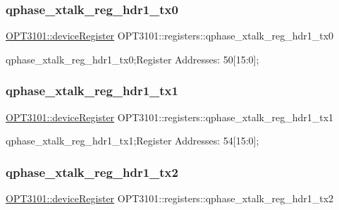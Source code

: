 \subsubsection{\texorpdfstring{qphase\+\_\+xtalk\+\_\+reg\+\_\+hdr1\+\_\+tx0}{qphase\_xtalk\_reg\_hdr1\_tx0}}
{\footnotesize\ttfamily \mbox{\hyperlink{class_o_p_t3101_1_1device_register}{O\+P\+T3101\+::device\+Register}} O\+P\+T3101\+::registers\+::qphase\+\_\+xtalk\+\_\+reg\+\_\+hdr1\+\_\+tx0}



qphase\+\_\+xtalk\+\_\+reg\+\_\+hdr1\+\_\+tx0;Register Addresses\+: 50\mbox{[}15\+:0\mbox{]}; 

\mbox{\label{class_o_p_t3101_1_1registers_a0d5f4bb0aaa58ed3a96bb2740eb6287e}} 
\subsubsection{\texorpdfstring{qphase\+\_\+xtalk\+\_\+reg\+\_\+hdr1\+\_\+tx1}{qphase\_xtalk\_reg\_hdr1\_tx1}}
{\footnotesize\ttfamily \mbox{\hyperlink{class_o_p_t3101_1_1device_register}{O\+P\+T3101\+::device\+Register}} O\+P\+T3101\+::registers\+::qphase\+\_\+xtalk\+\_\+reg\+\_\+hdr1\+\_\+tx1}



qphase\+\_\+xtalk\+\_\+reg\+\_\+hdr1\+\_\+tx1;Register Addresses\+: 54\mbox{[}15\+:0\mbox{]}; 

\mbox{\label{class_o_p_t3101_1_1registers_aae788b0ecb140f7ed12299e7f353440f}} 
\subsubsection{\texorpdfstring{qphase\+\_\+xtalk\+\_\+reg\+\_\+hdr1\+\_\+tx2}{qphase\_xtalk\_reg\_hdr1\_tx2}}
{\footnotesize\ttfamily \mbox{\hyperlink{class_o_p_t3101_1_1device_register}{O\+P\+T3101\+::device\+Register}} O\+P\+T3101\+::registers\+::qphase\+\_\+xtalk\+\_\+reg\+\_\+hdr1\+\_\+tx2}



